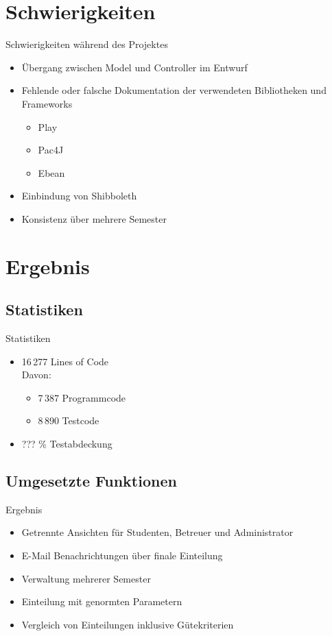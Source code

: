 \documentclass[18pt]{beamer}
\begin{document}
\section{Schwierigkeiten}
\begin{frame}{Schwierigkeiten während des Projektes}
\begin{itemize}
\item Übergang zwischen Model und Controller im Entwurf
\item Fehlende oder falsche Dokumentation der verwendeten Bibliotheken
und Frameworks
\begin{itemize}
\item Play
\item Pac4J
\item Ebean
\end{itemize}
\item Einbindung von Shibboleth
\item Konsistenz über mehrere Semester
\end{itemize}
\end{frame}

\section{Ergebnis}
\subsection{Statistiken}
\begin{frame}{Statistiken}
\begin{itemize}
\item 16\,277 Lines of Code \\ Davon:
\begin{itemize}
\item 7\,387 Programmcode
\item 8\,890 Testcode
\end{itemize}
\item ??? \% Testabdeckung
\end{itemize} 
\end{frame}

\subsection{Umgesetzte Funktionen}
\begin{frame}{Ergebnis} 
\begin{itemize}
 \item Getrennte Ansichten für Studenten, Betreuer und Administrator
 \item E-Mail Benachrichtungen über finale Einteilung
 \item Verwaltung mehrerer Semester
 \item Einteilung mit genormten Parametern
 \item Vergleich von Einteilungen inklusive Gütekriterien
\end{itemize}
\end{frame}
\end{document}
